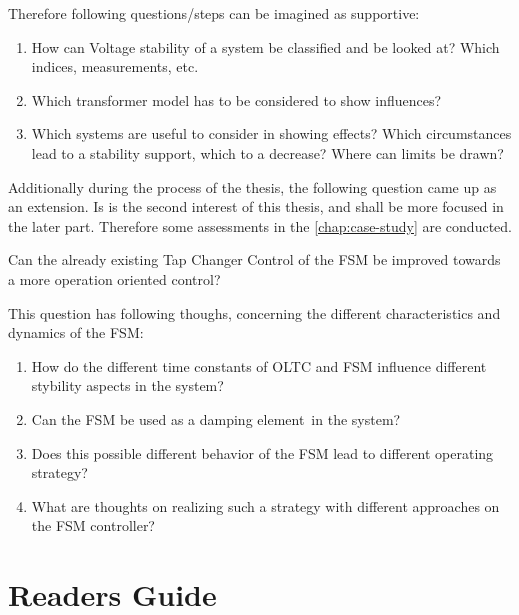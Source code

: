 Therefore following questions/steps can be imagined as supportive:
\begin{enumerate}
    \item How can Voltage stability of a system be classified and be looked at? Which indices, measurements, etc.
    \item Which transformer model has to be considered to show influences?
    \item Which systems are useful to consider in showing effects? Which circumstances lead to a stability support, which to a decrease? Where can limits be drawn?
\end{enumerate}

Additionally during the process of the thesis, the following question came up as an extension.
Is is the second interest of this thesis, and shall be more focused in the later part.
Therefore some assessments in the \autoref{chap:case-study} are conducted.

\begin{tcolorbox}[float, colback=ees_green!5!white,colframe=ees_green, toptitle=1mm, bottomtitle=1mm, left=2mm, right=2.5mm, top=2mm, bottom=2mm, title={\textbf{Additional Question of this Thesis}}]
    Can the already existing Tap Changer Control of the \acf{FSM} be improved towards a more operation oriented control?
\end{tcolorbox}

This question has following thoughs, concerning the different characteristics and dynamics of the \acs{FSM}:
\begin{enumerate}
    \item How do the different time constants of \acs{OLTC} and \acs{FSM} influence different stybility aspects in the system?
    \item Can the \acs{FSM} be used as a \glqq damping element\grqq~in the system?
    \item Does this possible different behavior of the \acs{FSM} lead to different operating strategy?
    \item What are thoughts on realizing such a strategy with different approaches on the \acs{FSM} controller?
\end{enumerate}

\section{Readers Guide}

